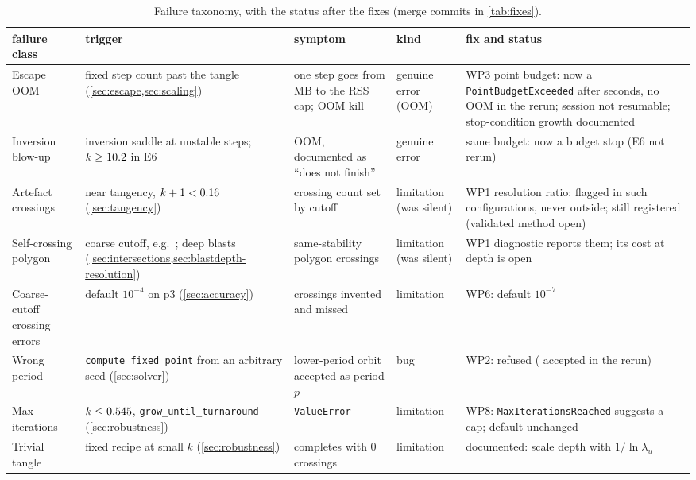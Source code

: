 \documentclass[11pt,a4paper]{article}
\newcommand{\code}[1]{\texttt{#1}}
\begin{document}
\begin{table}[p]
\centering\footnotesize
\caption{Failure taxonomy, with the status after the fixes (merge commits in
\cref{tab:fixes}).}
\label{tab:taxonomy}
\setlength{\tabcolsep}{3pt}
\begin{tabularx}{\textwidth}{@{}>{\raggedright\arraybackslash}p{2.2cm} Y Y >{\raggedright\arraybackslash}p{1.6cm} Y@{}}
\toprule
failure class & trigger & symptom & kind & fix and status \\
\midrule
Escape OOM & fixed step count past the tangle (\cref{sec:escape,sec:scaling}) & one step goes from MB to the RSS cap; OOM kill & genuine error (OOM) & WP3 point budget: now a \code{PointBudgetExceeded} after seconds, no OOM in the rerun; session not resumable; stop-condition growth documented \\
Inversion blow-up & inversion saddle at \NumInversionBudgetSteps{} unstable steps; $k\ge10.2$ in E6 & OOM, documented as ``does not finish'' & genuine error & same budget: now a budget stop (E6 not rerun) \\
Artefact crossings & near tangency, $k+1<0.16$ (\cref{sec:tangency}) & crossing count set by cutoff & limitation (was silent) & WP1 resolution ratio: flagged in \NumTangencyFlaggedBelow{} such configurations, never outside; still registered (validated method open) \\
Self-crossing polygon & coarse cutoff, e.g.\ \NumIsectUUCutoff{}; deep blasts (\cref{sec:intersections,sec:blastdepth-resolution}) & same-stability polygon crossings & limitation (was silent) & WP1 diagnostic reports them; its cost at depth is open \\
Coarse-cutoff crossing errors & default $10^{-4}$ on p3 (\cref{sec:accuracy}) & crossings invented and missed & limitation & WP6: default $10^{-7}$ \\
Wrong period & \code{compute\_fixed\_point} from an arbitrary seed (\cref{sec:solver}) & lower-period orbit accepted as period $p$ & bug & WP2: refused (\NumSolverLowerAccepted{} accepted in the rerun) \\
Max iterations & $k\le0.545$, \code{grow\_until\_turnaround} (\cref{sec:robustness}) & \code{ValueError} & limitation & WP8: \code{MaxIterationsReached} suggests a cap; default unchanged \\
Trivial tangle & fixed recipe at small $k$ (\cref{sec:robustness}) & completes with 0 crossings & limitation & documented: scale depth with $1/\ln\lambda_u$ \\

\end{tabularx}
\end{table}
\end{document}
